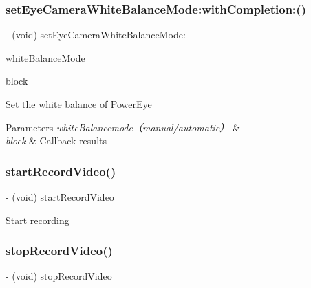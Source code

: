 \subsubsection{\texorpdfstring{set\+Eye\+Camera\+White\+Balance\+Mode\+:with\+Completion\+:()}{setEyeCameraWhiteBalanceMode:withCompletion:()}}
{\footnotesize\ttfamily -\/ (void) set\+Eye\+Camera\+White\+Balance\+Mode\+: \begin{DoxyParamCaption}\item[{(P\+V\+Eye\+Camera\+White\+Balance\+Mode)}]{white\+Balance\+Mode }\item[{withCompletion:(P\+V\+Completion\+Block)}]{block }\end{DoxyParamCaption}}

Set the white balance of Power\+Eye


\begin{DoxyParams}{Parameters}
{\em white\+Balancemode（manual/automatic）} & \\
\hline
{\em block} & Callback results \\
\hline
\end{DoxyParams}
\mbox{\label{interface_p_v_eye_camera_a1fc31e8a6aab22625c780b1ecaff5e87}} 
\subsubsection{\texorpdfstring{start\+Record\+Video()}{startRecordVideo()}}
{\footnotesize\ttfamily -\/ (void) start\+Record\+Video \begin{DoxyParamCaption}{ }\end{DoxyParamCaption}}

Start recording \mbox{\label{interface_p_v_eye_camera_a9b0113dbfb0790217f840d8c633e694e}} 
\subsubsection{\texorpdfstring{stop\+Record\+Video()}{stopRecordVideo()}}
{\footnotesize\ttfamily -\/ (void) stop\+Record\+Video \begin{DoxyParamCaption}{ }\end{DoxyParamCaption}}


